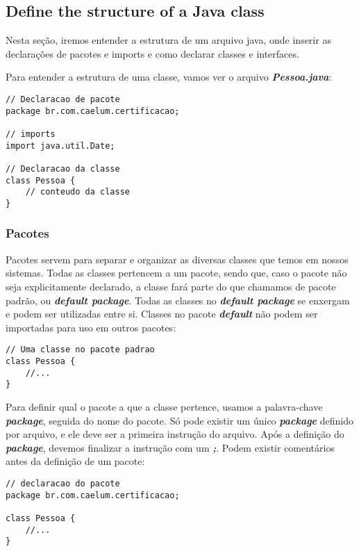 \documentclass[12pt]{article}
\begin{document}
\subsection{Define the structure of a Java class}

Nesta seção, iremos entender a estrutura de um arquivo java, onde inserir as declarações de pacotes e imports e como declarar classes e interfaces.

Para entender a estrutura de uma classe, vamos ver o arquivo \textbf{\textit{Pessoa.java}}:

\begin{lstlisting}
// Declaracao de pacote
package br.com.caelum.certificacao;
	
// imports
import java.util.Date;
	
// Declaracao da classe
class Pessoa {
	// conteudo da classe
}
\end{lstlisting}

\subsubsection{Pacotes}

Pacotes servem para separar e organizar as diversas classes que temos em nossos sistemas. Todas as classes pertencem a um pacote, sendo que, caso o pacote não seja explicitamente declarado, a classe fará parte do que chamamos de pacote padrão, ou \textbf{\textit{default package}}. Todas as classes no \textbf{\textit{default package}} se enxergam e podem ser utilizadas entre si. Classes no pacote \textbf{\textit{default}} não podem ser importadas para uso em outros pacotes:

\begin{lstlisting}
// Uma classe no pacote padrao
class Pessoa {
	//...
}
\end{lstlisting}

Para definir qual o pacote a que a classe pertence, usamos a palavra-chave \textbf{\textit{package}}, seguida do nome do pacote. Só pode existir um único \textbf{\textit{package}} definido por arquivo, e ele deve ser a primeira instrução do arquivo. Após a definição do \textbf{\textit{package}}, devemos finalizar a instrução com um \textbf{\textit{;}}. Podem existir comentários antes da definição de um pacote:

\begin{lstlisting}
// declaracao do pacote
package br.com.caelum.certificacao;
	
class Pessoa {
	//...
}
\end{lstlisting}
\end{document}
